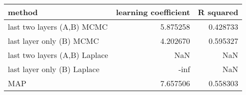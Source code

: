 \begin{tabular}{lrr}
\toprule
                        method &  learning coefficient &  R squared \\
\midrule
    last two layers (A,B) MCMC &              5.875258 &   0.428733 \\
      last layer only (B) MCMC &              4.202670 &   0.595327 \\
 last two layers (A,B) Laplace &                   NaN &        NaN \\
   last layer only (B) Laplace &                  -inf &        NaN \\
                           MAP &              7.657506 &   0.558303 \\
\bottomrule
\end{tabular}
